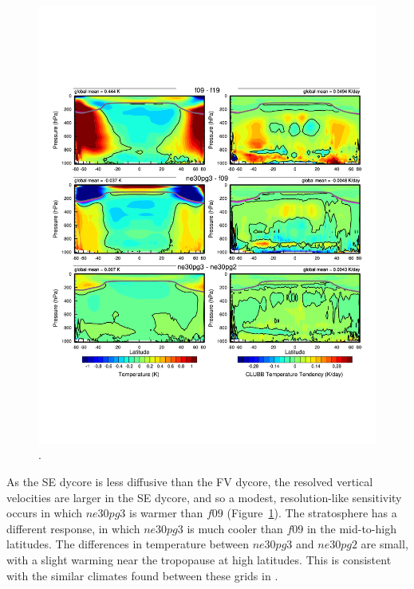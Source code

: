 \documentclass[draft]{agujournal2019}
\begin{document}
\begin{figure}[t]
\begin{center}
         \includegraphics[width=130mm]{figs/temp_dhgt_panel_STEND_CLUBB-lores.pdf}
\end{center}
\caption{.}
\label{fig:dT-lores}
\end{figure}

As the SE dycore is less diffusive than the FV dycore, the resolved vertical velocities are larger in the SE dycore, and so a modest, resolution-like sensitivity occurs in which $ne30pg3$ is warmer than $f09$ (Figure~\ref{fig:dT-lores}). The stratosphere has a different response, in which $ne30pg3$ is much cooler than $f09$ in the mid-to-high latitudes. The differences in temperature between $ne30pg3$ and $ne30pg2$ are small, with a slight warming near the tropopause at high latitudes. This is consistent with the similar climates found between these grids in \cite{HETAL2019JAMES}.
\end{document}
